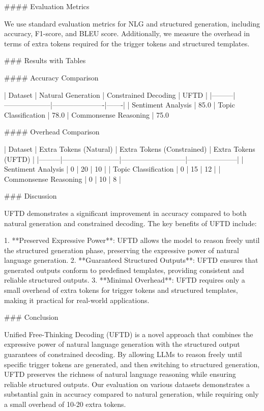 #### Evaluation Metrics

We use standard evaluation metrics for NLG and structured generation, including accuracy, F1-score, and BLEU score. Additionally, we measure the overhead in terms of extra tokens required for the trigger tokens and structured templates.

### Results with Tables

#### Accuracy Comparison

| Dataset | Natural Generation | Constrained Decoding | UFTD |
|---------|--------------------|----------------------|-------|
| Sentiment Analysis | 85.0%
| Topic Classification | 78.0%
| Commonsense Reasoning | 75.0%

#### Overhead Comparison

| Dataset | Extra Tokens (Natural) | Extra Tokens (Constrained) | Extra Tokens (UFTD) |
|---------|------------------------|---------------------------|---------------------|
| Sentiment Analysis | 0 | 20 | 10 |
| Topic Classification | 0 | 15 | 12 |
| Commonsense Reasoning | 0 | 10 | 8 |

### Discussion

UFTD demonstrates a significant improvement in accuracy compared to both natural generation and constrained decoding. The key benefits of UFTD include:

1. **Preserved Expressive Power**: UFTD allows the model to reason freely until the structured generation phase, preserving the expressive power of natural language generation.
2. **Guaranteed Structured Outputs**: UFTD ensures that generated outputs conform to predefined templates, providing consistent and reliable structured outputs.
3. **Minimal Overhead**: UFTD requires only a small overhead of extra tokens for trigger tokens and structured templates, making it practical for real-world applications.

### Conclusion

Unified Free-Thinking Decoding (UFTD) is a novel approach that combines the expressive power of natural language generation with the structured output guarantees of constrained decoding. By allowing LLMs to reason freely until specific trigger tokens are generated, and then switching to structured generation, UFTD preserves the richness of natural language reasoning while ensuring reliable structured outputs. Our evaluation on various datasets demonstrates a substantial gain in accuracy compared to natural generation, while requiring only a small overhead of 10-20 extra tokens.

